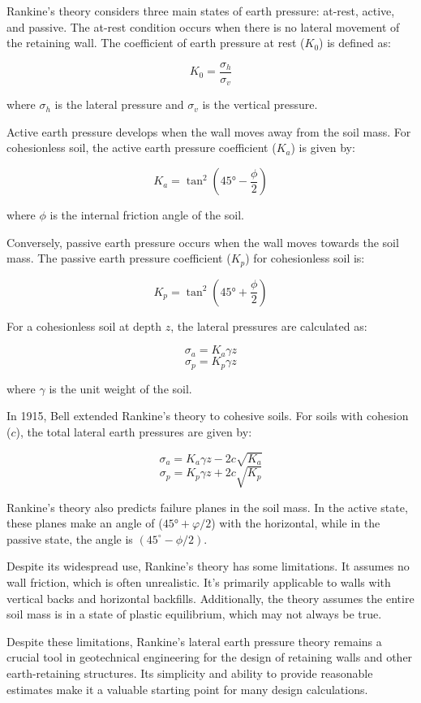 \documentclass[xcolor=dvipsnames,10pt,hidelinks]{article}
\begin{document}
\begin{itemize}
\begin{itemize}
Rankine's theory considers three main states of earth pressure: at-rest, active, and passive. The at-rest condition occurs when there is no lateral movement of the retaining wall. The coefficient of earth pressure at rest (\(K_0\)) is defined as:

$$ K_0 = \frac{\sigma_h}{\sigma_v} $$

where \(\sigma_{h}\) is the lateral pressure and \(\sigma_v\) is the vertical pressure.

Active earth pressure develops when the wall moves away from the soil mass. For cohesionless soil, the active earth pressure coefficient (\(K_a\)) is given by:

$$ K_a = \tan^2(45° - \frac{\phi}{2}) $$

where \(\phi\) is the internal friction angle of the soil.

Conversely, passive earth pressure occurs when the wall moves towards the soil mass. The passive earth pressure coefficient (\(K_p\)) for cohesionless soil is:

$$ K_p = \tan^2(45° + \frac{\phi}{2}) $$

For a cohesionless soil at depth \(z\), the lateral pressures are calculated as:

$$ \sigma_a = K_a \gamma z $$
$$ \sigma_p = K_p \gamma z $$

where \(\gamma\) is the unit weight of the soil.

In 1915, Bell extended Rankine's theory to cohesive soils. For soils with cohesion (\(c\)), the total lateral earth pressures are given by:

$$ \sigma_a = K_a \gamma z - 2c\sqrt{K_a} $$
$$ \sigma_p = K_p \gamma z + 2c\sqrt{K_p} $$

Rankine's theory also predicts failure planes in the soil mass. In the active state, these planes make an angle of (\(45° + φ/2\)) with the horizontal, while in the passive state, the angle is \((45^{\circ} - \phi/2)\).

Despite its widespread use, Rankine's theory has some limitations. It assumes no wall friction, which is often unrealistic. It's primarily applicable to walls with vertical backs and horizontal backfills. Additionally, the theory assumes the entire soil mass is in a state of plastic equilibrium, which may not always be true.

Despite these limitations, Rankine's lateral earth pressure theory remains a crucial tool in geotechnical engineering for the design of retaining walls and other earth-retaining structures. Its simplicity and ability to provide reasonable estimates make it a valuable starting point for many design calculations.


\end{itemize}
\end{itemize}
\end{document}
